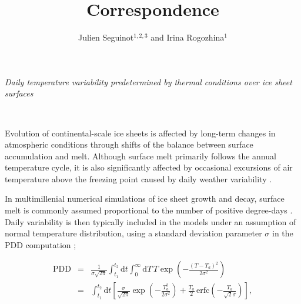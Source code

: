 \documentclass[review]{igs}
\begin{document}
\title[Correspondence]{Correspondence}
\author[Seguinot and Rogozhina]{Julien Seguinot$^{1,2,3}$ and Irina Rogozhina$^1$}

\maketitle


\emph{Daily temperature variability predetermined by thermal conditions over ice sheet surfaces}

~

Evolution of continental-scale ice sheets is affected by long-term changes in atmospheric conditions through shifts of the balance between surface accumulation and melt. Although surface melt primarily follows the annual temperature cycle, it is also significantly affected by occasional excursions of air temperature above the freezing point caused by daily weather variability \citep{arnold-mackay-1964}.

In multimillenial numerical simulations of ice sheet growth and decay, surface melt is commonly assumed proportional to the number of positive degree-days \citep[PDD;][]{hock-2003}. Daily variability is then typically included in the models under an assumption of normal temperature distribution, using a standard deviation parameter $\sigma$ in the PDD computation \citep{braithwaite-1984,reeh-1991,calov-greve-2005};

\begin{eqnarray} \label{eq:pdd}
    \mathrm{PDD} &=& \frac{1}{\sigma\sqrt{2\pi}}
        \int_{t_1}^{t_2} \mathrm{d}t
        \int_{0}^{\infty} \mathrm{d}T \,
        T \exp\left({-\frac{(T-T_a)^2}{2\sigma^2}}\right)\\
    &=& \int_{t_1}^{t_2} \mathrm{d}t
        \left[\frac{\sigma}{\sqrt{2\pi}} \exp\left({-\frac{T_a^2}{2\sigma^2}}\right)
        + \frac{T_a}{2} \, \mathrm{erfc} \left(-\frac{T_a}{\sqrt{2}\sigma}\right)\right],
\end{eqnarray}
\end{document}
